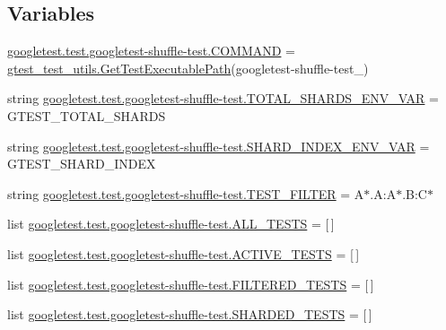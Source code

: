 \subsection*{Variables}
\begin{DoxyCompactItemize}
\item 
\mbox{\hyperlink{namespacegoogletest_1_1test_1_1googletest-shuffle-test_a999d0029c3b50bb490931da3d77e478d}{googletest.\+test.\+googletest-\/shuffle-\/test.\+C\+O\+M\+M\+A\+ND}} = \mbox{\hyperlink{namespacegtest__test__utils_a89ed3717984a80ffbb7a9c92f71b86a2}{gtest\+\_\+test\+\_\+utils.\+Get\+Test\+Executable\+Path}}(\textquotesingle{}googletest-\/shuffle-\/test\+\_\+\textquotesingle{})
\item 
string \mbox{\hyperlink{namespacegoogletest_1_1test_1_1googletest-shuffle-test_abbd179bd03d87366ae9dd0e10407e71d}{googletest.\+test.\+googletest-\/shuffle-\/test.\+T\+O\+T\+A\+L\+\_\+\+S\+H\+A\+R\+D\+S\+\_\+\+E\+N\+V\+\_\+\+V\+AR}} = \textquotesingle{}G\+T\+E\+S\+T\+\_\+\+T\+O\+T\+A\+L\+\_\+\+S\+H\+A\+R\+DS\textquotesingle{}
\item 
string \mbox{\hyperlink{namespacegoogletest_1_1test_1_1googletest-shuffle-test_affe4f2d4c0877dbd03096245be6709c6}{googletest.\+test.\+googletest-\/shuffle-\/test.\+S\+H\+A\+R\+D\+\_\+\+I\+N\+D\+E\+X\+\_\+\+E\+N\+V\+\_\+\+V\+AR}} = \textquotesingle{}G\+T\+E\+S\+T\+\_\+\+S\+H\+A\+R\+D\+\_\+\+I\+N\+D\+EX\textquotesingle{}
\item 
string \mbox{\hyperlink{namespacegoogletest_1_1test_1_1googletest-shuffle-test_a13e324173efc23728cfb835e208540a7}{googletest.\+test.\+googletest-\/shuffle-\/test.\+T\+E\+S\+T\+\_\+\+F\+I\+L\+T\+ER}} = \textquotesingle{}A$\ast$.A\+:A$\ast$.B\+:C$\ast$\textquotesingle{}
\item 
list \mbox{\hyperlink{namespacegoogletest_1_1test_1_1googletest-shuffle-test_a3790ffa0e946e4bcb48b36e65d6f3431}{googletest.\+test.\+googletest-\/shuffle-\/test.\+A\+L\+L\+\_\+\+T\+E\+S\+TS}} = \mbox{[}$\,$\mbox{]}
\item 
list \mbox{\hyperlink{namespacegoogletest_1_1test_1_1googletest-shuffle-test_aeca74d9ae23c774f35eeea56237cd308}{googletest.\+test.\+googletest-\/shuffle-\/test.\+A\+C\+T\+I\+V\+E\+\_\+\+T\+E\+S\+TS}} = \mbox{[}$\,$\mbox{]}
\item 
list \mbox{\hyperlink{namespacegoogletest_1_1test_1_1googletest-shuffle-test_a31d1bba61e47d93b9e80fb4b123f4812}{googletest.\+test.\+googletest-\/shuffle-\/test.\+F\+I\+L\+T\+E\+R\+E\+D\+\_\+\+T\+E\+S\+TS}} = \mbox{[}$\,$\mbox{]}
\item 
list \mbox{\hyperlink{namespacegoogletest_1_1test_1_1googletest-shuffle-test_a67455405b69cbd94dd861f63e89cb319}{googletest.\+test.\+googletest-\/shuffle-\/test.\+S\+H\+A\+R\+D\+E\+D\+\_\+\+T\+E\+S\+TS}} = \mbox{[}$\,$\mbox{]}

\end{DoxyCompactItemize}
